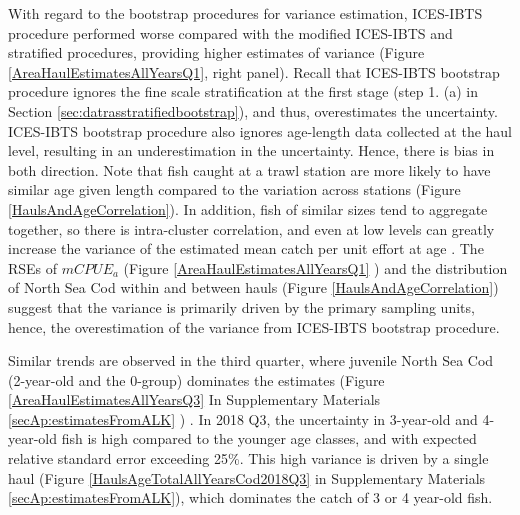 \documentclass[a4paper 12pt]{article}
\numberwithin{equation}{section}
\begin{document}
 With regard to the bootstrap procedures for variance estimation, ICES-IBTS procedure performed worse compared with the modified ICES-IBTS and stratified procedures, providing higher estimates of variance (Figure \ref{AreaHaulEstimatesAllYearsQ1}, right panel). Recall that  ICES-IBTS bootstrap  procedure ignores the fine scale stratification at the first stage (step 1. (a)  in Section \ref{sec:datrasstratifiedbootstrap}), and thus, overestimates the uncertainty. ICES-IBTS bootstrap procedure also ignores age-length data collected at the haul level, resulting in an underestimation in the uncertainty. Hence, there is bias in both direction. Note that fish caught at a trawl station are more likely to have similar age given length compared to the variation across stations (Figure \ref{HaulsAndAgeCorrelation}). In addition, fish of similar sizes tend to aggregate together, so there is intra-cluster correlation, and even at low levels can greatly increase the variance of the estimated mean catch per unit effort at age \citep{pennington1994assessing}. The RSEs of $mCPUE_{a}$ (Figure \ref{AreaHaulEstimatesAllYearsQ1} ) and  the distribution of North Sea Cod within and between hauls (Figure \ref{HaulsAndAgeCorrelation}) suggest that the variance is primarily driven by the primary sampling units, hence, the overestimation of the variance from ICES-IBTS bootstrap procedure. 

Similar trends are observed in the third quarter, where juvenile North Sea Cod (2-year-old and the 0-group) dominates the estimates (Figure \ref{AreaHaulEstimatesAllYearsQ3} In Supplementary Materials \ref{secAp:estimatesFromALK} ) . In 2018 Q3, the uncertainty in 3-year-old and 4-year-old fish is high compared to the younger age classes, and with expected relative standard error exceeding 25\%. This high variance is driven by a single haul (Figure \ref{HaulsAgeTotalAllYearsCod2018Q3} in Supplementary Materials \ref{secAp:estimatesFromALK}), which dominates the catch of 3 or 4 year-old fish.  \\
\end{document}
